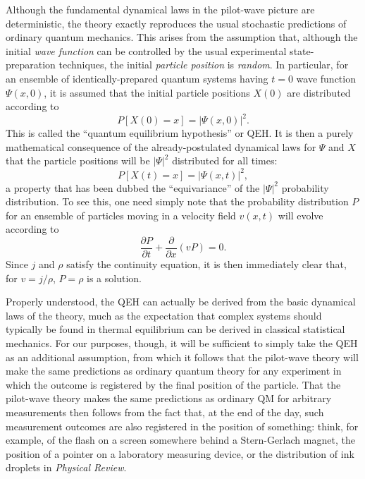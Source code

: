 \documentclass[aps,prc,twocolumn,letterpaper,floatfix]{revtex4}
\begin{document}
Although the fundamental dynamical laws in the
pilot-wave picture are deterministic, the theory exactly reproduces
the usual stochastic predictions of ordinary quantum mechanics.  This
arises from the assumption that, although the initial \emph{wave function}
can be controlled by the usual experimental state-preparation
techniques, the initial \emph{particle position} is \emph{random}.  In
particular, for an ensemble of identically-prepared quantum systems
having $t=0$ wave function $\Psi(x,0)$, it is assumed that the
initial particle positions $X(0)$ are distributed according to
\begin{equation}
P[X(0)\!=\!x] = |\Psi(x,0)|^2.
\label{QEH}
\end{equation}
This is called the ``quantum equilibrium hypothesis'' or QEH.
It is then a purely mathematical consequence of the already-postulated
dynamical laws for $\Psi$ and $X$ that the particle positions will
be $|\Psi|^2$ distributed for all times:
\begin{equation}
P[X(t) \!= \! x] = |\Psi(x,t)|^2,
\label{equiv}
\end{equation}
a property that has been dubbed the ``equivariance'' of the $|\Psi|^2$
probability distribution. \cite{dgz}
To see this, one need simply note that the probability distribution $P$
for an ensemble of particles moving in a velocity field $v(x,t)$
will evolve according to
\begin{equation}
\frac{\partial P}{\partial t} + \frac{\partial}{\partial x} ( v P ) = 0.
\end{equation}
Since $j$ and $\rho$ satisfy the continuity equation, 
it is then immediately clear that, for $v = j / \rho$, $P = \rho$ is a
solution.

Properly understood, the QEH can actually be derived from the basic
dynamical laws of the theory, much as the expectation that complex
systems should typically be found in thermal equilibrium can be
derived in classical statistical mechanics. \cite{dgz2}  For our purposes, though,
it will be sufficient to  simply take the QEH as
an additional assumption, from which it follows that the
pilot-wave theory will make the same predictions as ordinary quantum
theory for any experiment in which the outcome is registered by the
final position of the particle.  That the pilot-wave theory makes the
same predictions as ordinary QM for arbitrary measurements then
follows from the fact that, at the end of the day, such measurement
outcomes are also registered in the position of something:  think, for
example, of the flash on a screen somewhere behind a Stern-Gerlach
magnet, the position of a pointer on a laboratory measuring device, or
the distribution of ink droplets in \emph{Physical Review}. \cite{bellqft}
\end{document}
